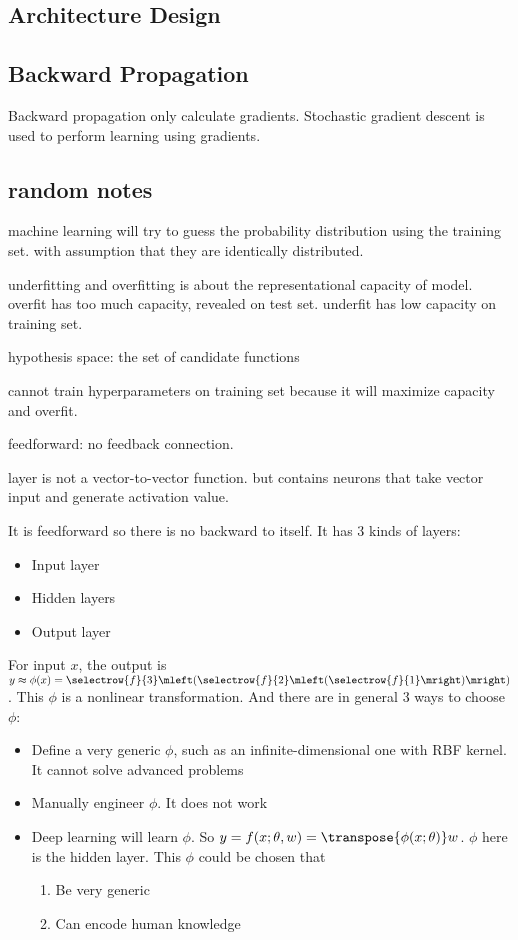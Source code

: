 \subsection{Architecture Design}


\subsection{Backward Propagation}

Backward propagation only calculate gradients. Stochastic gradient descent is used to perform learning using gradients.



\subsection{random notes}

machine learning will try to guess the probability distribution using the training set. with assumption that they are identically distributed.

underfitting and overfitting is about the representational capacity of model. overfit has too much capacity, revealed on test set. underfit has low capacity on training set.

hypothesis space: the set of candidate functions


cannot train hyperparameters on training set because it will maximize capacity and overfit.


feedforward: no feedback connection.

layer is not a vector-to-vector function. but contains neurons that take vector input and generate activation value.



It is feedforward so there is no backward to itself. It has 3 kinds of layers:
\begin{itemize}
    \item Input layer
    \item Hidden layers
    \item Output layer
\end{itemize}

For input $x$, the output is $y \approx \phi (x) = \selectrow{f}{3}\mleft( \selectrow{f}{2} \mleft(\selectrow{f}{1} \mright) \mright) $. This $\phi$ is a nonlinear transformation. And there are in general 3 ways to choose $\phi$:
\begin{itemize}
    \item Define a very generic $\phi$, such as an infinite-dimensional one with RBF kernel. It cannot solve advanced problems
    \item Manually engineer $\phi$. It does not work
    \item Deep learning will learn $\phi$. So $y = f(x; \theta, w) = \transpose{\phi(x;\theta)} w$. $\phi$ here is the hidden layer. This $\phi$ could be chosen that
        \begin{enumerate}
            \item Be very generic
            \item Can encode human knowledge
        \end{enumerate}
\end{itemize}


